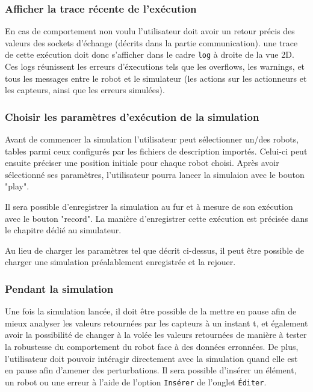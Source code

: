 \subsubsection{Afficher la trace récente de l'exécution}
En cas de comportement non voulu l'utilisateur doit avoir un retour précis des valeurs des sockets d'échange (décrits dans la partie communication). une trace de cette exécution doit donc s'afficher dans le cadre \texttt{log} à droite de la vue 2D. Ces logs réunissent les erreurs d'éxecutions tels que les overflows, les warnings, et tous les messages entre le robot et le simulateur (les actions sur les actionneurs et les capteurs, ainsi que les erreurs simulées).

\subsubsection{Choisir les paramètres d'exécution de la simulation}
Avant de commencer la simulation l'utilisateur peut sélectionner un/des robots, tables parmi ceux configurés par les fichiers de description importés.
Celui-ci peut ensuite préciser une position initiale pour chaque robot choisi.
Après avoir sélectionné ses paramètres, l'utilisateur pourra lancer la simulaion avec le bouton "play".

Il sera possible d'enregistrer la simulation au fur et à mesure de son exécution avec le bouton "record". La manière d'enregistrer cette exécution est précisée dans le chapitre dédié au simulateur.

Au lieu de charger les paramètres tel que décrit ci-dessus, il peut être possible de charger une simulation préalablement enregistrée et la rejouer.


\subsubsection{Pendant la simulation}
Une fois la simulation lancée, il doit être possible de la mettre en pause afin de mieux analyser les valeurs retournées par les capteurs à un instant t, et également avoir la possibilité de changer à la volée les valeurs retournées de manière à tester la robustesse du comportement du robot face à des données erronnées.
De plus, l'utilisateur doit pouvoir intéragir directement avec la simulation quand elle est en pause afin d'amener des perturbations. Il sera possible d'insérer un élément, un robot ou une erreur à l'aide de l'option \texttt{Insérer} de l'onglet \texttt{\'Editer}.







